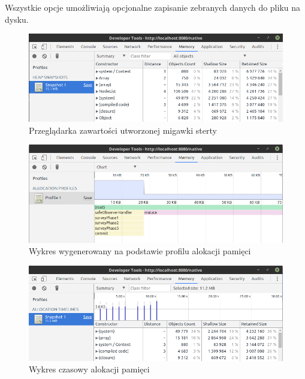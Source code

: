 \documentclass[polish, twoside, 12pt]{mwart}
\begin{document}
Wszystkie opcje umożliwiają opcjonalne zapisanie zebranych danych do pliku na dysku.

\begin{figure}[ht]
  \includegraphics[width=\textwidth]{chrome-devtools-performance-heap-snapshot.png}
  \caption{Przeglądarka zawartości utworzonej migawki sterty}
  \label{fig:chrome-devtools-performance-heap-snapshot}
\end{figure}

\begin{figure}[ht]
  \includegraphics[width=\textwidth]{chrome-devtools-performance-allocation-profile.png}
  \caption{Wykres wygenerowany na podstawie profilu alokacji pamięci}
  \label{fig:chrome-devtools-performance-allocation-profile}
\end{figure}

\begin{figure}[ht]
  \includegraphics[width=\textwidth]{chrome-devtools-performance-allocation-timeline.png}
  \caption{Wykres czasowy alokacji pamięci}
  \label{fig:chrome-devtools-performance-allocation-timeline}
\end{figure}
\end{document}
